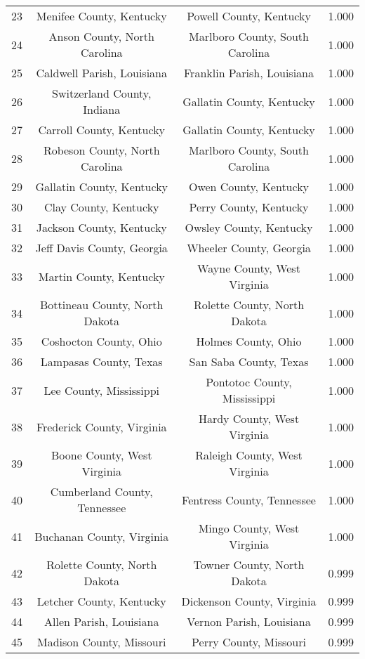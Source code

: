 \begin{longtable}{cccc}
  23 & Menifee County, Kentucky & Powell County, Kentucky & 1.000 \\ 
  24 & Anson County, North Carolina & Marlboro County, South Carolina & 1.000 \\ 
  25 & Caldwell Parish, Louisiana & Franklin Parish, Louisiana & 1.000 \\ 
  26 & Switzerland County, Indiana & Gallatin County, Kentucky & 1.000 \\ 
  27 & Carroll County, Kentucky & Gallatin County, Kentucky & 1.000 \\ 
  28 & Robeson County, North Carolina & Marlboro County, South Carolina & 1.000 \\ 
  29 & Gallatin County, Kentucky & Owen County, Kentucky & 1.000 \\ 
  30 & Clay County, Kentucky & Perry County, Kentucky & 1.000 \\ 
  31 & Jackson County, Kentucky & Owsley County, Kentucky & 1.000 \\ 
  32 & Jeff Davis County, Georgia & Wheeler County, Georgia & 1.000 \\ 
  33 & Martin County, Kentucky & Wayne County, West Virginia & 1.000 \\ 
  34 & Bottineau County, North Dakota & Rolette County, North Dakota & 1.000 \\ 
  35 & Coshocton County, Ohio & Holmes County, Ohio & 1.000 \\ 
  36 & Lampasas County, Texas & San Saba County, Texas & 1.000 \\ 
  37 & Lee County, Mississippi & Pontotoc County, Mississippi & 1.000 \\ 
  38 & Frederick County, Virginia & Hardy County, West Virginia & 1.000 \\ 
  39 & Boone County, West Virginia & Raleigh County, West Virginia & 1.000 \\ 
  40 & Cumberland County, Tennessee & Fentress County, Tennessee & 1.000 \\ 
  41 & Buchanan County, Virginia & Mingo County, West Virginia & 1.000 \\ 
  42 & Rolette County, North Dakota & Towner County, North Dakota & 0.999 \\ 
  43 & Letcher County, Kentucky & Dickenson County, Virginia & 0.999 \\ 
  44 & Allen Parish, Louisiana & Vernon Parish, Louisiana & 0.999 \\ 
  45 & Madison County, Missouri & Perry County, Missouri & 0.999 \\ 

\end{longtable}
